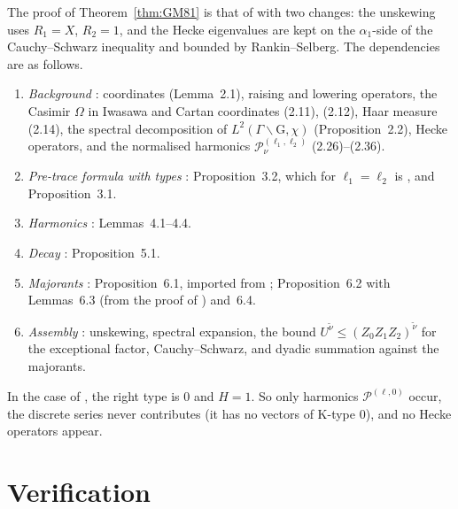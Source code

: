 \documentclass[11pt]{amsart}
\theoremstyle{remark}
\theoremstyle{definition}
\numberwithin{equation}{section}
\newcommand{\G}{\mathrm{G}}
\newcommand{\K}{\mathrm{K}}
\newcommand{\Pc}{\mathcal{P}}
\begin{document}
The proof of Theorem~\ref{thm:GM81} is that of \cite[Theorem~7.1]{GM1} with two changes: the unskewing uses $R_1=X$, $R_2=1$, and the Hecke eigenvalues are kept on the $\alpha_1$-side of the Cauchy--Schwarz inequality and bounded by Rankin--Selberg. The dependencies are as follows.
\begin{enumerate}
\item \emph{Background} \cite[\S2]{GM1}: coordinates (Lemma~2.1), raising and lowering operators, the Casimir $\Omega$ in Iwasawa and Cartan coordinates (2.11), (2.12), Haar measure (2.14), the spectral decomposition of $L^2(\Gamma\backslash\G,\chi)$ (Proposition~2.2), Hecke operators, and the normalised harmonics $\Pc^{(\ell_1,\ell_2)}_\nu$ (2.26)--(2.36).
\item \emph{Pre-trace formula with types} \cite[\S3]{GM1}: Proposition~3.2, which for $\ell_1=\ell_2$ is \cite[Proposition~5.2]{GM0}, and Proposition~3.1.
\item \emph{Harmonics} \cite[\S4]{GM1}: Lemmas~4.1--4.4.
\item \emph{Decay} \cite[\S5]{GM1}: Proposition~5.1.
\item \emph{Majorants} \cite[\S6]{GM1}: Proposition~6.1, imported from \cite[Proposition~6.1]{GM0}; Proposition~6.2 with Lemmas~6.3 (from the proof of \cite[Lemma~6.4]{GM0}) and~6.4.
\item \emph{Assembly} \cite[\S\S7--8]{GM1}: unskewing, spectral expansion, the bound $U^{\tilde\nu}\le(Z_0Z_1Z_2)^{\tilde\nu}$ for the exceptional factor, Cauchy--Schwarz, and dyadic summation against the majorants.
\end{enumerate}
In the case of \cite{II}, the right type is $0$ and $H=1$. So only harmonics $\Pc^{(\ell,0)}$ occur, the discrete series never contributes (it has no vectors of $\K$-type $0$), and no Hecke operators appear.

\section{Verification}\label{sec:verification}
\end{document}

